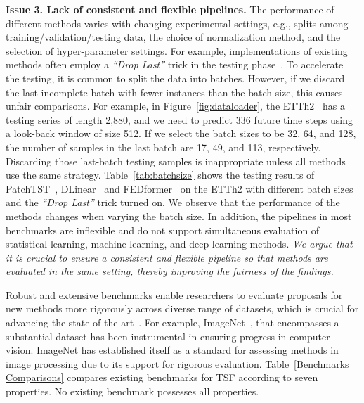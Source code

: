 \documentclass[sigconf, nonacm, pdfa]{acmart}
\begin{document}
\noindent
\textbf{Issue 3. Lack of consistent and flexible pipelines.} The performance of different methods varies with changing experimental settings, e.g., splits among training/validation/testing data, the choice of normalization method, and the selection of hyper-parameter settings. For example, implementations of existing methods often employ a \textit{``Drop Last''} trick in the testing phase~\cite{zhou2022fedformer,nie2022time,wang2022micn}. To accelerate the testing, it is common to split the data into batches. However, if we discard the last incomplete batch with fewer instances than the batch size, this causes unfair comparisons. 
For example, in Figure~\ref{fig:dataloader}, the ETTh2~\cite{zhou2021informer} has a testing series of length 2,880, and we need to predict 336 future time steps using a look-back window of size 512. If we select the batch sizes to be 32, 64, and 128, the number of samples in the last batch are 17, 49, and 113, respectively. 
Discarding those last-batch testing samples is inappropriate unless all methods use the same strategy. Table~\ref{tab:batchsize} shows the testing results of PatchTST~\cite{nie2022time}, DLinear~\cite{zeng2023transformers} and FEDformer~\cite{zhou2022fedformer} on the ETTh2 with different batch sizes and the \textit{``Drop Last''} trick turned on. We observe that the performance of the methods changes when varying the batch size. 
In addition, the pipelines in most benchmarks are inflexible and do not support simultaneous evaluation of statistical learning, machine learning, and deep learning methods. 
\textit{We argue that it is crucial to ensure a consistent and flexible pipeline so that methods are evaluated in the same setting, thereby improving the fairness of the findings.}




Robust and extensive benchmarks enable researchers to evaluate proposals for new methods more rigorously across diverse range of datasets, which is crucial for advancing the state-of-the-art~\cite{tanmonash,qiao2024class}. 
For example, ImageNet~\cite{deng2009imagenet}, that encompasses a substantial dataset has been instrumental in ensuring progress in computer vision. ImageNet has established itself as a standard for assessing methods in image processing due to its support for rigorous evaluation. 
Table~\ref{Benchmarks Comparisons} compares existing benchmarks for TSF according to seven properties. No existing benchmark possesses all properties.
\end{document}
